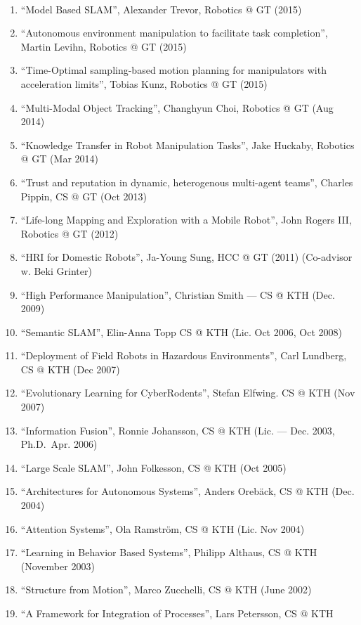 \documentclass{article}
\begin{document}
\begin{cv}
\begin{cvlist}{~}
\begin{enumerate}
			\item ``Model Based SLAM'', Alexander Trevor, Robotics @ GT (2015)
			\item ``Autonomous environment manipulation to facilitate task completion'',
			      Martin Levihn, Robotics @ GT (2015)
			\item ``Time-Optimal sampling-based motion planning for manipulators with
			      acceleration limits'', Tobias Kunz, Robotics @ GT (2015)
			\item ``Multi-Modal Object Tracking'', Changhyun Choi, Robotics @ GT (Aug
			      2014)
			\item ``Knowledge Transfer in Robot Manipulation Tasks'', Jake Huckaby,
			      Robotics @ GT (Mar 2014)
			\item ``Trust and reputation in dynamic, heterogenous multi-agent teams'',
			      Charles Pippin, CS @ GT (Oct 2013)
			\item ``Life-long Mapping and Exploration with a Mobile Robot'', John Rogers
			      III, Robotics @ GT (2012)
			\item ``HRI for Domestic Robots'', Ja-Young Sung, HCC @ GT (2011)
			      (Co-advisor w. Beki Grinter)
			\item ``High Performance Manipulation'', Christian Smith --- CS @ KTH (Dec.
			      2009)
			\item ``Semantic SLAM'', Elin-Anna Topp CS @ KTH (Lic. Oct 2006, Oct 2008)
			\item ``Deployment of Field Robots in Hazardous Environments'', Carl
			      Lundberg, CS @ KTH (Dec 2007)
			\item ``Evolutionary Learning for CyberRodents'', Stefan Elfwing. CS @ KTH
			      (Nov 2007)
			\item ``Information Fusion'', Ronnie Johansson, CS @ KTH (Lic. --- Dec. 2003,
			      Ph.D.\ Apr. 2006)
			\item ``Large Scale SLAM'', John Folkesson, CS @ KTH (Oct 2005)
			\item ``Architectures for Autonomous Systems'', Anders Oreb{\"a}ck, CS @ KTH
			      (Dec. 2004)
			\item ``Attention Systems'', Ola Ramstr\"om, CS @ KTH (Lic. Nov 2004)
			\item ``Learning in Behavior Based Systems'', Philipp Althaus, CS @ KTH
			      (November 2003)
			\item ``Structure from Motion'', Marco Zucchelli, CS @ KTH (June 2002)
			\item ``A Framework for Integration of Processes'', Lars Petersson, CS @ KTH

\end{enumerate}
\end{cvlist}
\end{cv}
\end{document}
